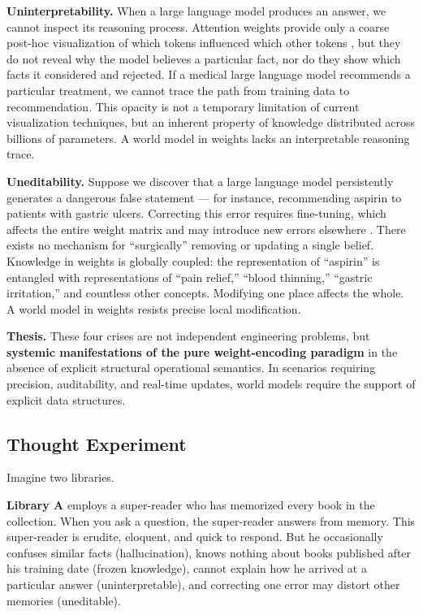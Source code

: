 \documentclass[11pt,a4paper]{article}
\begin{document}
\textbf{Uninterpretability.} When a large language model produces an
answer, we cannot inspect its reasoning process. Attention weights
provide only a coarse post-hoc visualization of which tokens influenced
which other tokens \cite{bahdanau2015}, but they do not reveal why the model
believes a particular fact, nor do they show which facts it considered
and rejected. If a medical large language model recommends a particular
treatment, we cannot trace the path from training data to
recommendation. This opacity is not a temporary limitation of current
visualization techniques, but an inherent property of knowledge
distributed across billions of parameters. A world model in weights
lacks an interpretable reasoning trace.

\textbf{Uneditability.} Suppose we discover that a large language model
persistently generates a dangerous false statement --- for instance,
recommending aspirin to patients with gastric ulcers. Correcting this
error requires fine-tuning, which affects the entire weight matrix and
may introduce new errors elsewhere \cite{meng2022}. There exists no mechanism
for ``surgically'' removing or updating a single belief. Knowledge in
weights is globally coupled: the representation of ``aspirin'' is
entangled with representations of ``pain relief,'' ``blood thinning,''
``gastric irritation,'' and countless other concepts. Modifying one
place affects the whole. A world model in weights resists precise local
modification.

\textbf{Thesis.} These four crises are not independent engineering
problems, but \textbf{systemic manifestations of the pure
weight-encoding paradigm} in the absence of explicit structural
operational semantics. In scenarios requiring precision, auditability,
and real-time updates, world models require the support of explicit data
structures.

\subsection{Thought Experiment}\label{thought-experiment}

Imagine two libraries.

\textbf{Library A} employs a super-reader who has memorized every book
in the collection. When you ask a question, the super-reader answers
from memory. This super-reader is erudite, eloquent, and quick to
respond. But he occasionally confuses similar facts (hallucination),
knows nothing about books published after his training date (frozen
knowledge), cannot explain how he arrived at a particular answer
(uninterpretable), and correcting one error may distort other memories
(uneditable).
\end{document}

